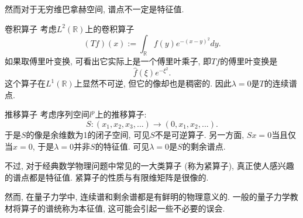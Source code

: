 然而对于无穷维巴拿赫空间, 谱点不一定是特征值.

\begin{example}{卷积算子}
考虑$L^2(\mathbb{R})$上的卷积算子
$$
(Tf)(x):=\int_{\mathbb{R}}f(y)e^{-(x-y)^2}dy.
$$
如果取傅里叶变换, 可看出它实际上是一个傅里叶乘子, 即$Tf$的傅里叶变换是
$$
\hat f(\xi)e^{-\xi^2}.
$$
这个算子在$L^1(\mathbb{R})$上显然不可逆, 但它的像却也是稠密的. 因此$\lambda=0$是$T$的连续谱点.
\end{example}

\begin{example}{推移算子}
考虑序列空间$l^p$上的推移算子:
$$
S:(x_1,x_2,x_3,...)\to(0,x_1,x_2,...).
$$
于是$S$的像是余维数为1的闭子空间, 可见$S$不是可逆算子. 另一方面, $Sx=0$当且仅当$x=0$, 于是$\lambda=0$并非$S$的特征值. 可见$\lambda=0$是$S$的剩余谱点.
\end{example}

不过, 对于经典数学物理问题中常见的一大类算子 (称为紧算子), 真正使人感兴趣的谱点都是特征值. 紧算子的性质与有限维矩阵是很像的.

然而, 在量子力学中, 连续谱和剩余谱都是有鲜明的物理意义的. 一般的量子力学教材将算子的谱统称为本征值, 这可能会引起一些不必要的误会.